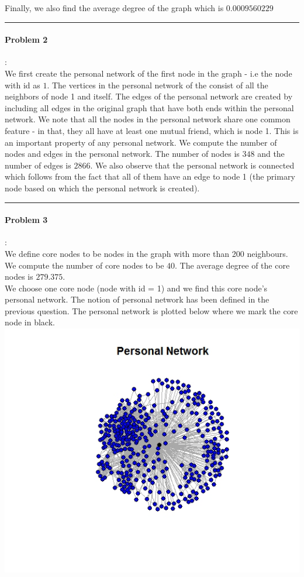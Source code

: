 \documentclass{article}
\begin{document}
Finally, we also find the average degree of the graph which is $\mathbf{0.0009560229}$\\

\hrule

\paragraph{Problem 2}:\\
We first create the personal network of the first node in the graph - i.e the node with id as $1$. The vertices in the personal network of the 
consist of all the neighbors of node 1 and itself. The edges of the personal network are created by 
including all edges in the original graph that have both ends within the personal network.
We note that all the nodes in the personal network share one common feature - in that, they all have at least one mutual friend, which is node 1. 
This is an important property of any personal network. We compute the number of nodes and edges in the personal network.
The number of nodes is $348$ and the number of edges is $2866$.
We also observe that the personal network is connected which follows from the fact that all of them have an edge to node 1 (the primary node 
based on which the personal network is created).\\

\hrule

\paragraph{Problem 3}:\\
We define core nodes to be nodes in the graph with more than 200 neighbours. We compute the number of 
core nodes to be $40$. The average degree of the core nodes is $279.375$.\\

We choose one core node (node with id = 1) and we find this core node's personal network. The notion of 
personal network has been defined in the previous question. The personal network is plotted below where we mark the 
core node in black.\\
\includegraphics[scale=0.4]{q4b} \\
\end{document}
